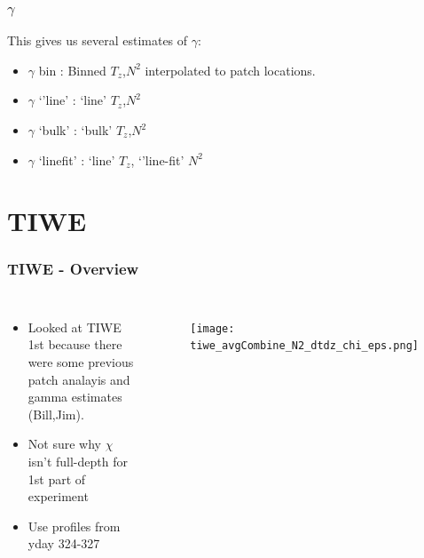 \documentclass{beamer}
\begin{document}
\begin{frame}
 \frametitle{$\gamma$}

This gives us several estimates of $\gamma$: 
\begin{itemize}
\item $\gamma$ bin : Binned $T_z$,$N^2$ interpolated to patch locations.
\item $\gamma$ `'line' : `line' $T_z$,$N^2$
\item $\gamma$ `bulk' : `bulk' $T_z$,$N^2$
\item $\gamma$ `linefit' : `line' $T_z$, `'line-fit' $N^2$
\end{itemize}

\end{frame}



\section{TIWE}


\begin{frame}
 \frametitle{TIWE - Overview}

\begin{columns}
\begin{itemize}
\item Looked at TIWE 1st because there were some previous patch analayis and gamma estimates (Bill,Jim).
\item Not sure why $\chi$ isn't full-depth for 1st part of experiment
\item Use profiles from yday 324-327
\end{itemize}

\begin{figure}[htbp]
\begin{center}
\texttt{[image: tiwe\_avgCombine\_N2\_dtdz\_chi\_eps.png]}
\caption{}
\label{default}
\end{center}
\end{figure}

\end{columns}


\end{frame}
\end{document}
